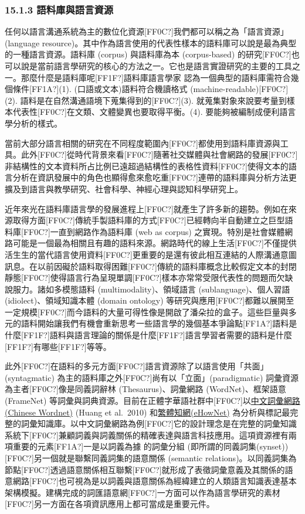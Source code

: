 \subsubsection{15.1.3 語料庫與語言資源}

任何以語言溝通系統為主的數位化資源[FF0C?]我們都可以稱之為「語言資源」(language resource)。其中作為語言使用的代表性樣本的語料庫可以說是最為典型的一種語言資源。語料庫 (corpus) 與語料庫為本 (corpus-based) 的研究[FF0C?]也可以說是當前語言學研究的核心的方法之一。它也是語言實證研究的主要的工具之一。那麼什麼是語料庫呢[FF1F?]語料庫語言學家 \parencite{Gries2019} 認為一個典型的語料庫需符合幾個條件[FF1A?](1). (口語或文本)語料符合機讀格式 (machine-readable)[FF0C?](2). 語料是在自然溝通語境下蒐集得到的[FF0C?](3). 就蒐集對象來說要考量到樣本代表性[FF0C?]在文類、文體變異也要取得平衡。(4). 要能夠被編制成便利語言學分析的樣式。

當前大部分語言相關的研究在不同程度範圍內[FF0C?]都使用到語料庫資源與工具。此外[FF0C?]從時代背景來看[FF0C?]隨著社交媒體與社會網路的發展[FF0C?]非結構性的文本資料所占比例已遠超過結構性的表格性資料[FF0C?]使得文本的語言分析在資訊發展中的角色也顯得愈來愈吃重[FF0C?]連帶的語料庫與分析方法更擴及到語言與教學研究、社會科學、神經心理與認知科學研究上。

近年來光在語料庫語言學的發展進程上[FF0C?]就產生了許多新的趨勢。例如在來源取得方面[FF0C?]傳統手製語料庫的方式[FF0C?]已經轉向半自動建立之巨型語料庫[FF0C?]一直到網路作為語料庫 (web as corpus) 之實現。特別是社會媒體網路可能是一個最為相關且有趣的語料來源。網路時代的線上生活[FF0C?]不僅提供活生生的當代語言使用資料[FF0C?]更重要的是還有彼此相互連結的人際溝通意圖訊息。在以前因礙於語料取得困難[FF0C?]傳統的語料庫概念比較假定文本的封閉靜態[FF0C?]使得語言行為呈現單調[FF0C?]樣本亦常常受限代表性的問題而欠缺說服力。諸如多模態語料 (multimodality)、領域語言 (sublanguage)、個人習語 (idiolect)、領域知識本體 (domain ontology) 等研究與應用[FF0C?]都難以展開至一定規模[FF0C?]而今語料的大量可得性像是開啟了潘朵拉的盒子。這些巨量與多元的語料開始讓我們有機會重新思考一些語言學的幾個基本爭論點[FF1A?]語料是什麼[FF1F?]語料與語言理論的關係是什麼[FF1F?]語言學習者需要的語料是什麼[FF1F?]有哪些[FF1F?]等等。

此外[FF0C?]在語料的多元方面[FF0C?]語言資源除了以語言使用「共面」(syntagmatic) 為主的語料庫之外[FF0C?]尚有以「立面」(paradigmatic) 詞彙資源為主者[FF0C?]像是同義詞辭林 (Thesaurus)、詞彙網路 (WordNet)、框架語意 (FrameNet) 等詞彙與詞典資源。目前在正體字華語社群中[FF0C?]以\href{https://lope.linguistics.ntu.edu.tw/cwn2/}{中文詞彙網路}\href{https://lope.linguistics.ntu.edu.tw/cwn2/}{ (Chinese Wordnet)} (Huang et al.~2010) 和\href{http://ehownet.iis.sinica.edu.tw/}{繁體知網}\href{http://ehownet.iis.sinica.edu.tw/}{(eHowNet)} 為分析與標記最完整的詞彙知識庫。以中文詞彙網路為例[FF0C?]它的設計理念是在完整的詞彙知識系統下[FF0C?]兼顧詞義與詞義關係的精確表達與語言科技應用。這項資源裡有兩項重要的元素[FF1A?]一是以詞義為據 的詞彙分組 (即所謂的同義詞集(synset))[FF0C?]另一個就是聯繫同義詞集的語意關係 (semantic relations)。以同義詞集為節點[FF0C?]透過語意關係相互聯繫[FF0C?]就形成了表徵詞彙意義及其關係的語意網路[FF0C?]也可視為是以詞義與語意關係為經緯建立的人類語言知識表達基本架構模擬。建構完成的詞匯語意網[FF0C?]一方面可以作為語言學研究的素材[FF0C?]另一方面在各項資訊應用上都可當成是重要元件。

